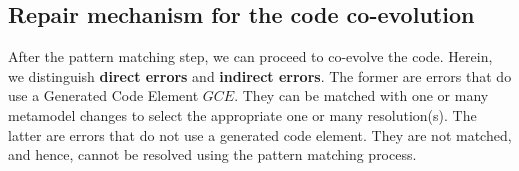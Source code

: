 	
	

	
	
	
	
	\subsection{Repair mechanism for the code co-evolution}
	\label{repairmechanism}
	
	
	
	After the pattern matching step, we can proceed to co-evolve the code. 
	Herein, we distinguish \textbf{direct errors} and \textbf{indirect errors}. The former are errors that do use a Generated Code Element $GCE$. They can be matched with one or many metamodel changes to select the appropriate one or many resolution(s). 
	The latter are errors that %
	do not use a generated code element. They are not matched, and hence, cannot be resolved using the pattern matching process. %
	

